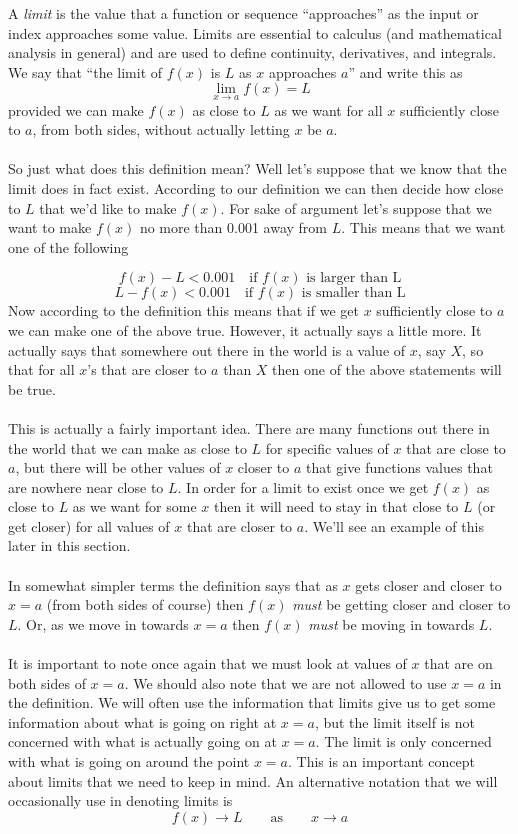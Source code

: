 \documentclass[10pt,reqno]{book}
\begin{document}
	A \textit{limit} is the value that a function or sequence ``approaches'' as the input or index approaches some value. Limits are essential to calculus (and mathematical analysis in general) and are used to define continuity, derivatives, and integrals. We say that ``the limit of $ f(x) $ is $ L $ as $ x $ approaches $ a $'' and write this as
	\[ \lim\limits_{x\to a} f(x) = L \]
	provided we can make $ f(x) $ as close to $ L $ as we want for all $ x $ sufficiently close to $ a $, from both sides, without actually letting $ x $ be $ a $.\\ \\
	So just what does this definition mean? Well let's suppose that we know that the limit does in fact exist. According to our definition we can then decide how close to $ L $ that we'd like to make $ f(x) $. For sake of argument let's suppose that we want to make $ f(x) $ no more than 0.001 away from $ L $. This means that we want one of the following
	
	\[ f(x) - L < 0.001 \quad \text{if } f(x) \text{ is larger than L} \]
	\[ L - f(x) < 0.001 \quad \text{if } f(x) \text{ is smaller than L} \]
	Now according to the definition this means that if we get $ x $ sufficiently close to $ a $ we can make one of the above true. However, it actually says a little more. It actually says that somewhere out there in the world is a value of $ x $, say $ X $, so that for all $ x $'s that are closer to $ a $ than $ X $ then one of the above statements will be true. \\ \\
	This is actually a fairly important idea. There are many functions out there in the world that we can make as close to $ L $ for specific values of $ x $ that are close to $ a $, but there will be other values of $ x $ closer to $ a $ that give functions values that are nowhere near close to $ L $. In order for a limit to exist once we get $ f(x) $ as close to $ L $ as we want for some $ x $ then it will need to stay in that close to $ L $ (or get closer) for all values of $ x $ that are closer to $ a $. We'll see an example of this later in this section.\\ \\
	In somewhat simpler terms the definition says that as $ x $ gets closer and closer to $ x=a $ (from both sides of course) then $ f(x) $ \textit{must} be getting closer and closer to $ L $. Or, as we move in towards $ x=a $ then $ f(x) $ \textit{must} be moving in towards $ L $.\\ \\
	It is important to note once again that we must look at values of $ x $ that are on both sides of $ x=a $. We should also note that we are not allowed to use $ x=a $ in the definition. We will often use the information that limits give us to get some information about what is going on right at $ x=a $, but the limit itself is not concerned with what is actually going on at $ x=a $. The limit is only concerned with what is going on around the point $ x=a $. This is an important concept about limits that we need to keep in mind. An alternative notation that we will occasionally use in denoting limits is
	\[ f(x) \to L \qquad \text{as} \qquad x \to a \]
	
\end{document}
